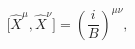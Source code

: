 \begin{equation}
\lbrack\widehat{X}^{\mu},\widehat{X}^{\nu}]=\left(  \frac{i}{B}\right)
^{\mu\nu},\label{7}%
\end{equation}

